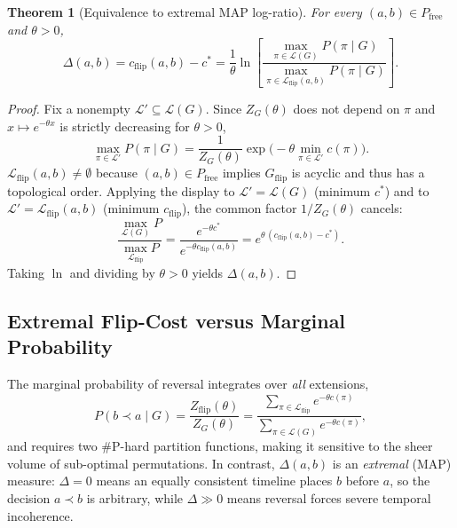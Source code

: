 \documentclass{ieeeaccess}
\newtheorem{theorem}{Theorem}
\newcommand{\Pfree}{P_{\mathrm{free}}}
\newcommand{\Lin}{\mathcal{L}}
\begin{document}
\begin{theorem}[Equivalence to extremal MAP log-ratio]\label{thm:map}
For every $(a,b)\in\Pfree$ and $\theta>0$,
\begin{equation}
\Delta(a,b)=c_{\mathrm{flip}}(a,b)-c^*=\frac{1}{\theta}\ln\!\left[\frac{\max_{\pi\in\Lin(G)}P(\pi\mid G)}{\max_{\pi\in\Lin_{\mathrm{flip}}(a,b)}P(\pi\mid G)}\right].
\end{equation}
\end{theorem}
\begin{proof}
Fix a nonempty $\Lin'\subseteq\Lin(G)$. Since $Z_G(\theta)$ does not depend on $\pi$ and $x\mapsto e^{-\theta x}$ is strictly decreasing for $\theta>0$,
\begin{equation}
\max_{\pi\in\Lin'}P(\pi\mid G)=\frac{1}{Z_G(\theta)}\exp\!\Big(-\theta\min_{\pi\in\Lin'}c(\pi)\Big).
\end{equation}
$\Lin_{\mathrm{flip}}(a,b)\neq\emptyset$ because $(a,b)\in\Pfree$ implies $G_{\mathrm{flip}}$ is acyclic and thus has a topological order. Applying the display to $\Lin'=\Lin(G)$ (minimum $c^*$) and to $\Lin'=\Lin_{\mathrm{flip}}(a,b)$ (minimum $c_{\mathrm{flip}}$), the common factor $1/Z_G(\theta)$ cancels:
\begin{equation}
\frac{\max_{\Lin(G)}P}{\max_{\Lin_{\mathrm{flip}}}P}=\frac{e^{-\theta c^*}}{e^{-\theta c_{\mathrm{flip}}(a,b)}}=e^{\theta\,(c_{\mathrm{flip}}(a,b)-c^*)}.
\end{equation}
Taking $\ln$ and dividing by $\theta>0$ yields $\Delta(a,b)$.
\end{proof}

\subsection{Extremal Flip-Cost versus Marginal Probability}
The marginal probability of reversal integrates over \emph{all} extensions,
\begin{equation}
P(b\prec a\mid G)=\frac{Z_{\mathrm{flip}}(\theta)}{Z_G(\theta)}=\frac{\sum_{\pi\in\Lin_{\mathrm{flip}}}e^{-\theta c(\pi)}}{\sum_{\pi\in\Lin(G)}e^{-\theta c(\pi)}},
\end{equation}
and requires two $\#$P-hard partition functions, making it sensitive to the sheer volume of sub-optimal permutations. In contrast, $\Delta(a,b)$ is an \emph{extremal} (MAP) measure: $\Delta=0$ means an equally consistent timeline places $b$ before $a$, so the decision $a\prec b$ is arbitrary, while $\Delta\gg0$ means reversal forces severe temporal incoherence.
\end{document}
